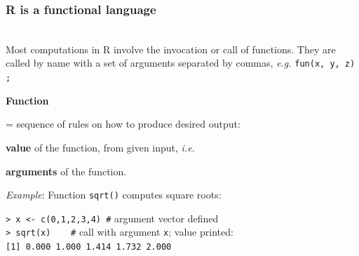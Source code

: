 \documentclass[handout,12pt]{beamer}
\begin{document}
\begin{frame}\frametitle{R is a functional language}
\ \\

Most computations in R involve the {invocation} or {call} of functions.  They are called by name with a set of arguments separated by commas, \emph{e.g.} {\tt fun(x, y, z) ;} 

  {\bf Function} \\ 
  \bi
  \item[=] sequence of rules on how to produce 
    desired output: 
   \item[ ] {\bf value} of the function, 
    from given input, {\it i.e.} 
   \item[ ] {\bf arguments} of the function.
 \ei
 
\emph{Example}: Function {\tt sqrt()} computes square roots:

\medskip
{\tt > x <- c(0,1,2,3,4)  \#} argument vector defined\\
{\tt > sqrt(x)\ \ \ \ \#} call with argument {\tt x}; value printed:\\
{\tt [1] 0.000 1.000 1.414 1.732 2.000}
 
\end{frame} 

\end{document}
